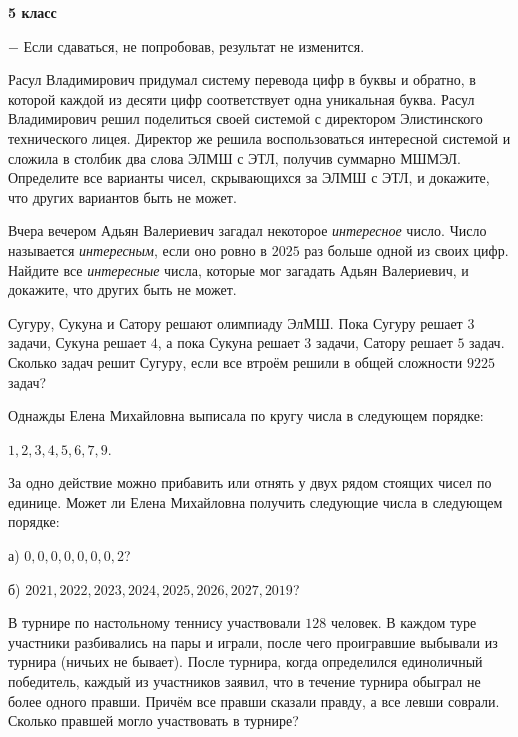 \hspace{3mm}

\centerline{\bf \huge 5 класс}

\begin{flushright}
        \scriptsize{ $-$ Если сдаваться, не попробовав, результат не изменится.}
\end{flushright}

 Расул Владимирович придумал систему перевода цифр в буквы и обратно, в которой каждой из десяти цифр соответствует одна уникальная буква. Расул Владимирович решил поделиться своей системой с директором Элистинского технического лицея. Директор же решила воспользоваться интересной системой и сложила в столбик два слова ЭЛМШ с ЭТЛ, получив суммарно МШМЭЛ. Определите все варианты чисел, скрывающихся за ЭЛМШ с ЭТЛ, и докажите, что других вариантов быть не может.

 Вчера вечером Адьян Валериевич загадал некоторое \textit{интересное} число. Число называется \textit{интересным}, если оно ровно в $2025$ раз больше одной из своих цифр. Найдите все \textit{интересные} числа, которые мог загадать Адьян Валериевич, и докажите, что других быть не может.

Сугуру, Сукуна и Сатору решают олимпиаду ЭлМШ. Пока Сугуру решает $3$ задачи, Сукуна решает $4$, а пока Сукуна решает $3$ задачи, Сатору решает $5$ задач. Сколько задач решит Сугуру, если все втроём решили в общей сложности $9225$ задач?

Однажды Елена Михайловна выписала по кругу числа в следующем порядке:

$1, 2, 3, 4, 5, 6, 7, 9.$

За одно действие можно прибавить или отнять у двух рядом стоящих чисел по единице. Может ли Елена Михайловна получить следующие числа в следующем порядке:

а) $0, 0, 0, 0, 0, 0, 0, 2$? 

б) $2021, 2022, 2023, 2024, 2025, 2026, 2027, 2019$? 

В турнире по настольному теннису участвовали $128$ человек. В каждом туре участники разбивались на пары и играли, после чего проигравшие выбывали из турнира (ничьих не бывает). После турнира, когда определился единоличный победитель, каждый из участников заявил, что в течение турнира обыграл не более одного правши. Причём все правши сказали правду, а все левши соврали. Сколько правшей могло участвовать в турнире?
